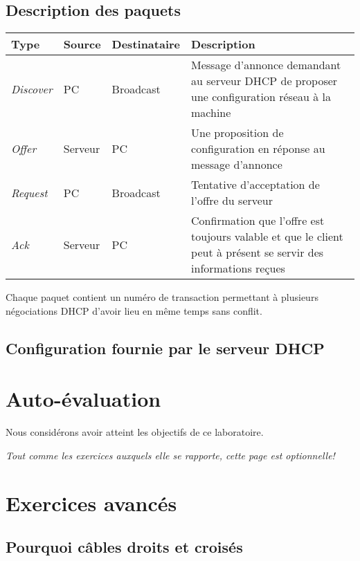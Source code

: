 \documentclass[11pt,a4paper]{article}
\begin{document}
\subsection{Description des paquets}

\begin{tabular}{|l||l|l|p{9cm}|}
\hline
	\textbf{Type} & \textbf{Source} & \textbf{Destinataire} & \textbf{Description} \\
\hline
	\textit{Discover} &
	PC & Broadcast &
	Message d'annonce demandant au serveur DHCP de proposer une configuration réseau à la machine \\
\hline
	\textit{Offer} &
	Serveur & PC &
	Une proposition de configuration en réponse au message d'annonce \\
\hline
	\textit{Request} &
	PC & Broadcast &
	Tentative d'acceptation de l'offre du serveur \\
\hline
	\textit{Ack} &
	Serveur & PC &
	Confirmation que l'offre est toujours valable et que le client peut à présent se servir des informations reçues \\
	\hline
\end{tabular}

\vspace{1em}

Chaque paquet contient un numéro de transaction permettant à plusieurs négociations DHCP d'avoir lieu en même temps sans conflit.

\subsection{Configuration fournie par le serveur DHCP}

\section{Auto-évaluation}

Nous considérons avoir atteint les objectifs de ce laboratoire.

\pagebreak

\textit{Tout comme les exercices auxquels elle se rapporte, cette page est optionnelle!}

\section{Exercices avancés}

\subsection{Pourquoi câbles droits et croisés}
\end{document}
